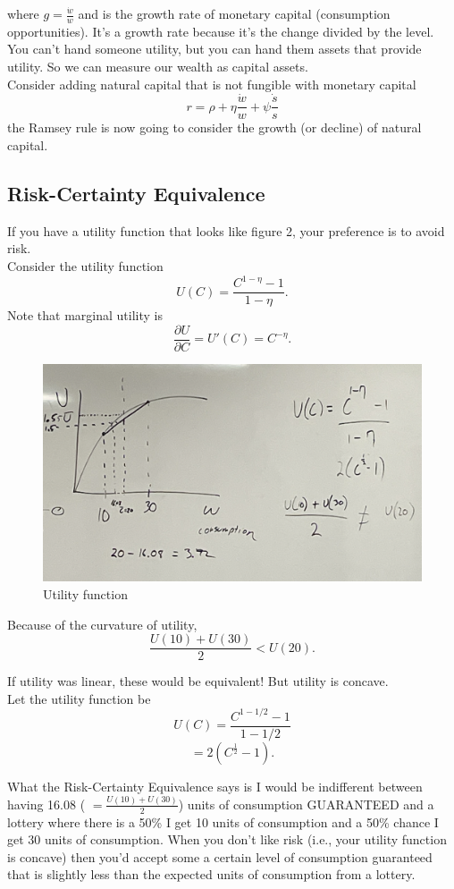 \documentclass{article}
\begin{document}
where $g = \frac{\dot w}{w}$ and is the growth rate of monetary capital (consumption opportunities). It's a growth rate because it's the change divided by the level. You can't hand someone utility, but you can hand them assets that provide utility. So we can measure our wealth as capital assets. \\

Consider adding natural capital that is not fungible with monetary capital 
$$r = \rho + \eta \frac{\dot w}{w} + \psi \frac{\dot s}{s}$$
the Ramsey rule is now going to consider the growth (or decline) of natural capital.\\

\subsection{Risk-Certainty Equivalence}
If you have a utility function that looks like figure 2, your preference is to avoid risk. \\

Consider the utility function 
$$ U(C) = \frac{C^{1-\eta} - 1}{1 - \eta}.$$
Note that marginal utility is 
$$\frac{\partial U}{\partial C} =U'(C) = C^{-\eta}.$$

\begin{figure}[htp]
    \centering
    \includegraphics[width=12cm]{Screen Shot 2023-02-15 at 9.24.07 AM.png}
    \caption{Utility function}
\end{figure}

Because of the curvature of utility, 
$$\frac{U(10) + U(30)}{2} < U(20).$$

If utility was linear, these would be equivalent! But utility is concave. \\

Let the utility function be 
$$ U(C) = \frac{C^{1-1/2} - 1}{1 - 1/2}$$
$$= 2(C^{\frac{1}{2}} - 1).$$

What the Risk-Certainty Equivalence says is I would be indifferent between having 16.08 ( $=  \frac{U(10) + U(30)}{2}$) units of consumption GUARANTEED and a lottery where there is a 50\% I get 10 units of consumption and a 50\% chance I get 30 units of consumption. When you don't like risk (i.e., your utility function is concave) then you'd accept some a certain level of consumption guaranteed that is slightly less than the expected units of consumption from a lottery. 
\end{document}
